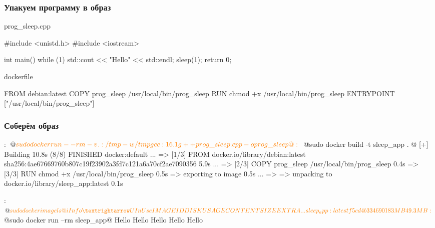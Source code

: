 \documentclass[9pt, aspectratio=1610]{beamer}
\begin{document}
\begin{frame}[fragile=singleslide]\frametitle{Упакуем программу в образ}
	
	\begin{block}{prog\_sleep.cpp}
		\begin{cppcode}
			#include <unistd.h>
			#include <iostream>
			
			int main()
			{
				while (1)
				{
					std::cout << "Hello" << std::endl;
					sleep(1);
				}	
				return 0;	
			}
			\end{cppcode}
	\end{block}
	
	\begin{block}{dockerfile}
		\begin{dockerfile}
			FROM debian:latest
			COPY prog_sleep /usr/local/bin/prog_sleep
			RUN chmod +x /usr/local/bin/prog_sleep
			ENTRYPOINT ["/usr/local/bin/prog_sleep"]
		\end{dockerfile}
	\end{block}
	
\end{frame}

\begin{frame}[fragile=singleslide]\frametitle{Соберём образ}
	
	\begin{cmdcode}[escapeinside=\@\@,fontsize=\footnotesize]
		
		:~$ @\color{orange}sudo docker run --rm -v .:/tmp -w /tmp gcc:16.1 g++ prog\_sleep.cpp -o prog\_sleep@ 
		:~$ @\color{orange}sudo docker build -t sleep\_app . @
		[+] Building 10.8s (8/8) FINISHED                                                               docker:default
		...
		=> [1/3] FROM docker.io/library/debian:latest sha256:4ae67669760b807c19f23902a3fd7c121a6a70cf2ae7090356  5.9s
		...
		=> [2/3] COPY prog_sleep /usr/local/bin/prog_sleep                                                       0.4s
		=> [3/3] RUN chmod +x /usr/local/bin/prog_sleep                                                          0.5s
		=> exporting to image                                                                                    0.5s
		...
		=> => unpacking to docker.io/library/sleep_app:latest                                                    0.1s
		
		:~$ @\color{orange}sudo docker image ls@ 
		i Info →   U  In Use
		IMAGE                      ID             DISK USAGE   CONTENT SIZE   EXTRA
		...
		sleep_app:latest           f5cd4b334690        183MB         49.3MB
			
		:~$ @\color{orange}sudo docker run --rm sleep\_app@ 
		Hello
		Hello
		Hello
		Hello
		Hello
	\end{cmdcode}
	
\end{frame}
\end{document}
